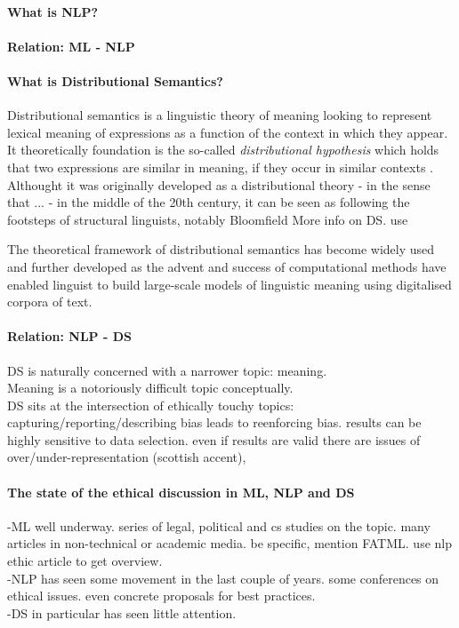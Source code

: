 \documentclass{article}
\begin{document}
\paragraph{What is NLP?}
\paragraph{Relation: ML - NLP}
\paragraph{What is Distributional Semantics?}
Distributional semantics is a linguistic theory of meaning looking to represent lexical meaning of expressions as a function of the context in which they appear. It theoretically foundation is the so-called \emph{distributional hypothesis} which holds that two expressions are similar in meaning, if they occur in similar contexts \cite{harris1954distributional}.
Althought it was originally developed as a distributional theory - in the sense that ... - in the middle of the 20th century, it can be seen as following the footsteps of structural linguists, notably Bloomfield \cite{bloomfield}
More info on DS. use \cite{boleda2016formal}

The theoretical framework of distributional semantics has become widely used and further developed as the advent and success of computational methods have enabled linguist to build large-scale models of linguistic meaning using digitalised corpora of text. 

\paragraph{Relation: NLP - DS}
DS is naturally concerned with a narrower topic: meaning.\\
Meaning is a notoriously difficult topic conceptually.\\
DS sits at the intersection of ethically touchy topics: capturing/reporting/describing bias leads to reenforcing bias. results can be highly sensitive to data selection. even if results are valid there are issues of over/under-representation (scottish accent),
 
\paragraph{The state of the ethical discussion in ML, NLP and DS}
-ML well underway. series of legal, political and cs studies on the topic. many articles in non-technical or academic media. be specific, mention FATML. use nlp ethic article to get overview.\\
-NLP has seen some movement in the last couple of years. some conferences on ethical issues. even concrete proposals for best practices.\\
-DS in particular has seen little attention.
\end{document}
